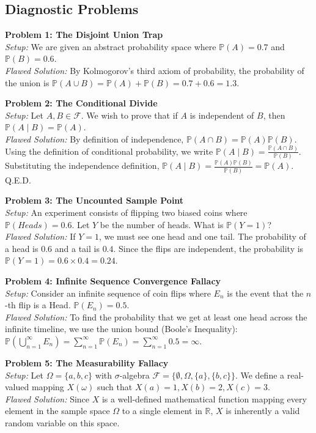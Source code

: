 \documentclass[11pt]{article}
\theoremstyle{definition}
\theoremstyle{plain}
\theoremstyle{remark}
\newcommand{\R}{\mathbb{R}}
\newcommand{\F}{\mathcal{F}}
\renewcommand{\P}{\mathbb{P}}
\newcommand{\1}{\mathbf{1}}
\begin{document}
\subsection{Diagnostic Problems}
\textbf{Problem 1: The Disjoint Union Trap}\\
\textit{Setup:} We are given an abstract probability space where $\P(A) = 0.7$ and $\P(B) = 0.6$. \\
\textit{Flawed Solution:} By Kolmogorov's third axiom of probability, the probability of the union is $\P(A \cup B) = \P(A) + \P(B) = 0.7 + 0.6 = 1.3$.

\textbf{Problem 2: The Conditional Divide}\\
\textit{Setup:} Let $A, B \in \F$. We wish to prove that if $A$ is independent of $B$, then $\P(A \mid B) = \P(A)$.\\
\textit{Flawed Solution:} By definition of independence, $\P(A \cap B) = \P(A)\P(B)$. Using the definition of conditional probability, we write $\P(A \mid B) = \frac{\P(A \cap B)}{\P(B)}$. Substituting the independence definition, $\P(A \mid B) = \frac{\P(A)\P(B)}{\P(B)} = \P(A)$. Q.E.D.

\textbf{Problem 3: The Uncounted Sample Point}\\
\textit{Setup:} An experiment consists of flipping two biased coins where $\P(Heads) = 0.6$. Let $Y$ be the number of heads. What is $\P(Y = 1)$?\\
\textit{Flawed Solution:} If $Y = 1$, we must see one head and one tail. The probability of a head is $0.6$ and a tail is $0.4$. Since the flips are independent, the probability is $\P(Y = 1) = 0.6 \times 0.4 = 0.24$.

\textbf{Problem 4: Infinite Sequence Convergence Fallacy}\\
\textit{Setup:} Consider an infinite sequence of coin flips where $E_n$ is the event that the $n$-th flip is a Head. $\P(E_n) = 0.5$. \\
\textit{Flawed Solution:} To find the probability that we get at least one head across the infinite timeline, we use the union bound (Boole's Inequality): $\P(\bigcup_{n=1}^\infty E_n) = \sum_{n=1}^\infty \P(E_n) = \sum_{n=1}^\infty 0.5 = \infty$.

\textbf{Problem 5: The Measurability Fallacy}\\
\textit{Setup:} Let $\Omega = \{a, b, c\}$ with $\sigma$-algebra $\F = \{\emptyset, \Omega, \{a\}, \{b, c\}\}$. We define a real-valued mapping $X(\omega)$ such that $X(a) = 1, X(b) = 2, X(c) = 3$.\\
\textit{Flawed Solution:} Since $X$ is a well-defined mathematical function mapping every element in the sample space $\Omega$ to a single element in $\R$, $X$ is inherently a valid random variable on this space. 
\end{document}
